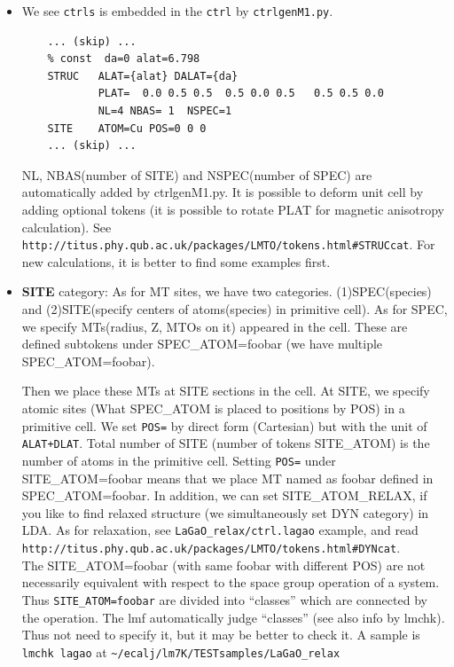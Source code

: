 \documentclass[a4paper,10pt,epsf,fleqn]{article}
\begin{document}
{\begin{itemize}
\item
We see \verb+ctrls+ is embedded in the \verb+ctrl+ by \verb+ctrlgenM1.py+.
\begin{verbatim}
    ... (skip) ...
    % const  da=0 alat=6.798
    STRUC   ALAT={alat} DALAT={da}
            PLAT=  0.0 0.5 0.5  0.5 0.0 0.5   0.5 0.5 0.0
            NL=4 NBAS= 1  NSPEC=1
    SITE    ATOM=Cu POS=0 0 0
    ... (skip) ...
\end{verbatim}
NL, NBAS(number of SITE) and NSPEC(number of SPEC) are automatically
added by ctrlgenM1.py.
It is possible to deform unit cell by adding optional tokens
(it is possible to rotate PLAT for magnetic anisotropy calculation).
See \verb+http://titus.phy.qub.ac.uk/packages/LMTO/tokens.html#STRUCcat+.
For new calculations, it is better to find some examples first.

\item
{\bf SITE} category:
As for MT sites, we have two categories.
(1)SPEC(species) and (2)SITE(specify centers of atoms(species) in primitive cell).
As for SPEC, we specify MTs(radius, Z, MTOs on it) appeared in the cell.
These are defined subtokens under SPEC\_ATOM=foobar (we have multiple SPEC\_ATOM=foobar).

Then we place these MTs at SITE sections in the cell.
At SITE, we specify atomic sites 
(What SPEC\_ATOM is placed to positions by POS) in a primitive cell.
We set \verb+POS=+ by direct form (Cartesian) but with the unit of \verb$ALAT+DLAT$.
Total number of SITE (number of tokens SITE\_ATOM) is
the number of atoms in the primitive cell.
Setting \verb+POS=+ under  SITE\_ATOM=foobar 
means that we place MT named as foobar defined in SPEC\_ATOM=foobar.
In addition, we can set SITE\_ATOM\_RELAX, if you like to find relaxed
structure (we simultaneously set DYN category) in LDA. As for
relaxation, see \verb+LaGaO_relax/ctrl.lagao+
example, and read\\ \verb+http://titus.phy.qub.ac.uk/packages/LMTO/tokens.html#DYNcat+.\\

The SITE\_ATOM=foobar (with same foobar with different POS) are not
necessarily equivalent with respect to the space group operation of a system.
Thus \verb+SITE_ATOM=foobar+ are divided into ``classes'' which are
connected by the operation. 
The lmf automatically judge ``classes'' (see also info by lmchk). 
Thus not need to specify it, but it may be better to check it.
A sample is \verb+lmchk lagao+ at \verb+~/ecalj/lm7K/TESTsamples/LaGaO_relax+


\end{itemize}}
\end{document}
